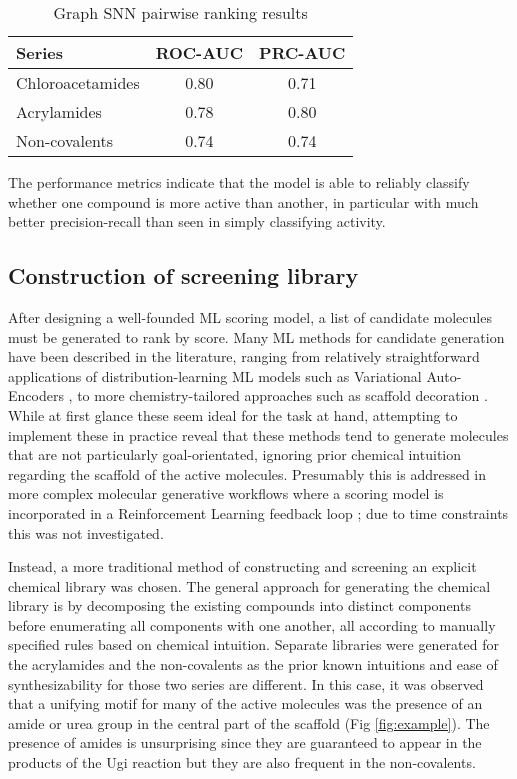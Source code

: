 \begin{table}[!h]
\caption{Graph SNN pairwise ranking results}
\centering
\label{table:pairwise_table}
\begin{tabular}{l c c}
\toprule
 Series & ROC-AUC & PRC-AUC \\ 
\midrule
Chloroacetamides & 0.80 & 0.71  \\

Acrylamides & 0.78 & 0.80 \\

Non-covalents & 0.74 & 0.74 \\
\bottomrule
\end{tabular}
\end{table}

The performance metrics indicate that the model is able to reliably classify whether one compound is more active than another, in particular with much better precision-recall than seen in simply classifying activity.

\subsection{Construction of screening library}
After designing a well-founded ML scoring model, a list of candidate molecules must be generated to rank by score. Many ML methods for candidate generation have been described in the literature, ranging from relatively straightforward applications of distribution-learning ML models such as Variational Auto-Encoders \cite{Bombarelli2018VAE}, to more chemistry-tailored approaches such as scaffold decoration \cite{Pous2020scaffold}. While at first glance these seem ideal for the task at hand, attempting to implement these in practice reveal that these methods tend to generate molecules that are not particularly goal-orientated, ignoring prior chemical intuition regarding the scaffold of the active molecules. Presumably this is addressed in more complex molecular generative workflows where a scoring model is incorporated in a Reinforcement Learning feedback loop \cite{born2019paccmannrl}; due to time constraints this was not investigated.

Instead, a more traditional method of constructing and screening an explicit chemical library was chosen. The general approach for generating the chemical library is by decomposing the existing compounds into distinct components before enumerating all components with one another, all according to manually specified rules based on chemical intuition. Separate libraries were generated for the acrylamides and the non-covalents as the prior known intuitions and ease of synthesizability for those two series are different. In this case, it was observed that a unifying motif for many of the active molecules was the presence of an amide or urea group in the central part of the scaffold (Fig \ref{fig:example}). The presence of amides is unsurprising since they are guaranteed to appear in the products of the Ugi reaction but they are also frequent in the non-covalents. 

